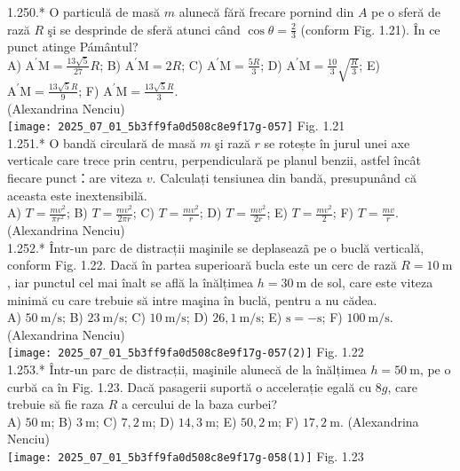 {1.250.* O particulă de masă $m$ alunecă fără frecare pornind din $A$ pe o sferă de rază $R$ şi se desprinde de sferă atunci când $\cos \theta=\frac{2}{3}$ (conform Fig. 1.21). În ce punct atinge Pámântul?\\ A) $\mathrm{A}^{\prime} \mathrm{M}=\frac{13 \sqrt{5}}{27} R$; B) $\mathrm{A}^{\prime} \mathrm{M}=2 R$; C) $\mathrm{A}^{\prime} \mathrm{M}=\frac{5 R}{3}$; D) $\mathrm{A}^{\prime} \mathrm{M}=\frac{10}{3} \sqrt{\frac{R}{3}}$; E) $\mathrm{A}^{\prime} \mathrm{M}=\frac{13 \sqrt{5} R}{9}$; F) $\mathrm{A}^{\prime} \mathrm{M}=\frac{13 \sqrt{5} R}{3}$.\\ (Alexandrina Nenciu)\\ \texttt{[image: 2025\_07\_01\_5b3ff9fa0d508c8e9f17g-057]} Fig. 1.21\\

1.251.* O bandă circulară de masă $m$ şi rază $r$ se rotește în jurul unei axe verticale care trece prin centru, perpendiculară pe planul benzii, astfel încât fiecare punct：are viteza $v$. Calculați tensiunea din bandă, presupunând că aceasta este inextensibilă.\\ A) $T=\frac{m v^{2}}{\pi r^{2}}$; B) $T=\frac{m v^{2}}{2 \pi r}$; C) $T=\frac{m v^{2}}{r}$; D) $T=\frac{m v^{2}}{2 r}$; E) $T=\frac{m v^{2}}{2}$; F) $T=\frac{m v}{r}$.\\ (Alexandrina Nenciu)\\

1.252.* Într-un parc de distracții maşinile se deplaseazã pe o buclă verticală, conform Fig. 1.22. Dacă în partea superioară bucla este un cerc de rază $R=10 \mathrm{~m}$, iar punctul cel mai înalt se află la înălțimea $h=30 \mathrm{~m}$ de sol, care este viteza minimă cu care trebuie să intre maşina în buclă, pentru a nu cădea.\\ A) $50 \mathrm{~m} / \mathrm{s}$; B) $23 \mathrm{~m} / \mathrm{s}$; C) $10 \mathrm{~m} / \mathrm{s}$; D) $26,1 \mathrm{~m} / \mathrm{s}$; E) $\mathrm{s}=-\mathrm{s}$; F) $100 \mathrm{~m} / \mathrm{s}$.\\ (Alexandrina Nenciu)\\ \texttt{[image: 2025\_07\_01\_5b3ff9fa0d508c8e9f17g-057(2)]} Fig. 1.22\\

1.253.* Într-un parc de distracții, maşinile alunecă de la înălțimea $h=50 \mathrm{~m}$, pe o curbă ca în Fig. 1.23. Dacă pasagerii suportă o accelerație egală cu $8 g$, care trebuie să fie raza $R$ a cercului de la baza curbei?\\ A) $50 \mathrm{~m}$; B) $3 \mathrm{~m}$; C) $7,2 \mathrm{~m}$; D) $14,3 \mathrm{~m}$; E) $50,2 \mathrm{~m}$; F) $17,2 \mathrm{~m}$. (Alexandrina Nenciu)\\ \texttt{[image: 2025\_07\_01\_5b3ff9fa0d508c8e9f17g-058(1)]} Fig. 1.23\\

}
